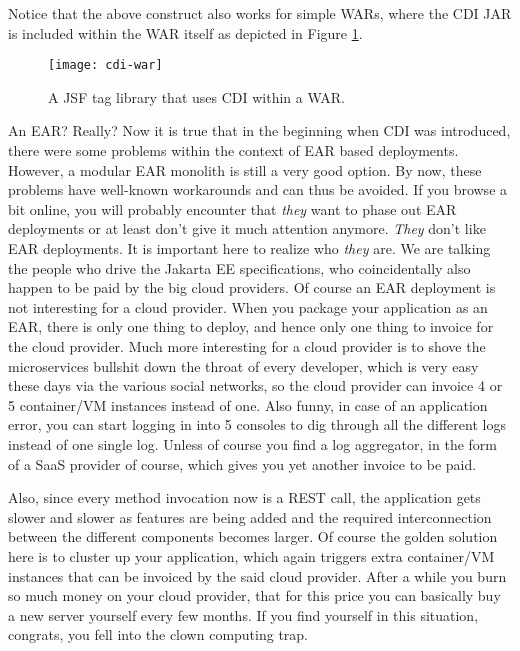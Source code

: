 Notice that the above construct also works for simple WARs, where the CDI JAR is included within the WAR itself as depicted in Figure \ref{fig:cdi-war}.
\begin{figure}[htbp]
	\begin{center}
		\texttt{[image: cdi-war]}
		\caption{A JSF tag library that uses CDI within a WAR.}
		\label{fig:cdi-war}
	\end{center}
\end{figure}
\begin{ClownComputing}{An EAR? Really?}
Now it is true that in the beginning when CDI was introduced,
there were some problems within the context of EAR based deployments.
However, a modular EAR monolith is still a very good option.
By now, these problems have well-known workarounds and can thus be avoided.
If you browse a bit online, you will probably encounter that \textit{they} want to phase out EAR deployments or at least don't give it much attention anymore.
\textit{They} don't like EAR deployments.
It is important here to realize who \textit{they} are.
We are talking the people who drive the Jakarta EE specifications,
who coincidentally also happen to be paid by the big cloud providers.
Of course an EAR deployment is not interesting for a cloud provider.
When you package your application as an EAR,
there is only one thing to deploy, and hence only one thing to invoice for the cloud provider.
Much more interesting for a cloud provider is to shove the microservices bullshit down the throat of every developer,
which is very easy these days via the various social networks,
so the cloud provider can invoice 4 or 5 container/VM instances instead of one.
Also funny, in case of an application error,
you can start logging in into 5 consoles to dig through all the different logs instead of one single log.
Unless of course you find a log aggregator, in the form of a SaaS provider of course, which gives you yet another invoice to be paid.

Also, since every method invocation now is a REST call,
the application gets slower and slower as features are being added and the required interconnection between the different components becomes larger.
Of course the golden solution here is to cluster up your application,
which again triggers extra container/VM instances that can be invoiced by the said cloud provider.
After a while you burn so much money on your cloud provider, that for this price you can basically buy a new server yourself every few months.
If you find yourself in this situation, congrats, you fell into the clown computing trap.


\end{ClownComputing}

